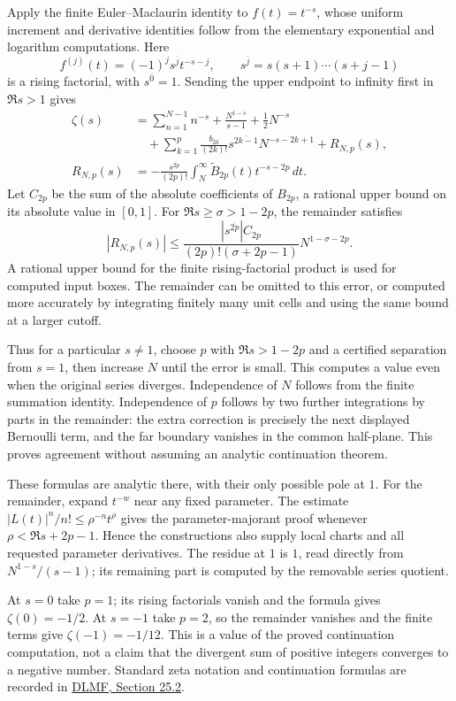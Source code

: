 Apply the finite Euler--Maclaurin identity to $f(t)=t^{-s}$, whose
uniform increment and derivative identities follow from the elementary
exponential and logarithm computations.  Here
\[
 f^{(j)}(t)=(-1)^j s^{\overline j}t^{-s-j},\qquad
 s^{\overline j}=s(s+1)\cdots(s+j-1)
\]
is a rising factorial, with $s^{\overline0}=1$.
Sending the upper endpoint to infinity first in $\Re s>1$ gives
\begin{align*}
 \zeta(s)&=\sum_{n=1}^{N-1}n^{-s}
       +\frac{N^{1-s}}{s-1}+\frac12N^{-s}\\
 &\quad+\sum_{k=1}^p\frac{b_{2k}}{(2k)!}
                   s^{\overline{2k-1}}N^{-s-2k+1}
       +R_{N,p}(s),\\
 R_{N,p}(s)&=-\frac{s^{\overline{2p}}}{(2p)!}
              \int_N^\infty\widetilde B_{2p}(t)t^{-s-2p}\,dt.
\end{align*}
Let $C_{2p}$ be the sum of the absolute coefficients of $B_{2p}$, a
rational upper bound on its absolute value in $[0,1]$.  For
$\Re s\ge\sigma>1-2p$, the remainder satisfies
\[
 \boxed{|R_{N,p}(s)|\le
 \frac{|s^{\overline{2p}}|C_{2p}}{(2p)!(\sigma+2p-1)}
                 N^{1-\sigma-2p}.}
\]
A rational upper bound for the finite rising-factorial product is used
for computed input boxes.  The remainder can be omitted to this error,
or computed more accurately by integrating finitely many unit cells and
using the same bound at a larger cutoff.

Thus for a particular $s\ne1$, choose $p$ with $\Re s>1-2p$ and a
certified separation from $s=1$, then increase $N$ until the error is small.
This computes a value even when the original series diverges.
Independence of $N$ follows from the finite summation identity.  Independence
of $p$ follows by two further integrations by parts in the remainder:
the extra correction is precisely the next displayed Bernoulli term,
and the far boundary vanishes in the common half-plane.  This proves
agreement without assuming an analytic continuation theorem.

These formulas are analytic there, with their only possible pole at $1$.
For the remainder, expand $t^{-w}$ near any fixed parameter.  The estimate
$|L(t)|^n/n!\le\rho^{-n}t^\rho$ gives the parameter-majorant proof
whenever $\rho<\Re s+2p-1$.  Hence the constructions also supply local
charts and all requested parameter derivatives.  The residue at $1$ is
$1$, read directly from $N^{1-s}/(s-1)$; its remaining part is computed
by the removable series quotient.

At $s=0$ take $p=1$; its rising factorials vanish and the formula gives
$\zeta(0)=-1/2$.  At $s=-1$ take $p=2$, so the remainder vanishes and
the finite terms give $\zeta(-1)=-1/12$.  This is a value of the proved
continuation computation, not a claim that the divergent sum of positive
integers converges to a negative number.  Standard zeta notation and
continuation formulas are recorded in
\href{https://dlmf.nist.gov/25.2}{DLMF, Section 25.2}.


